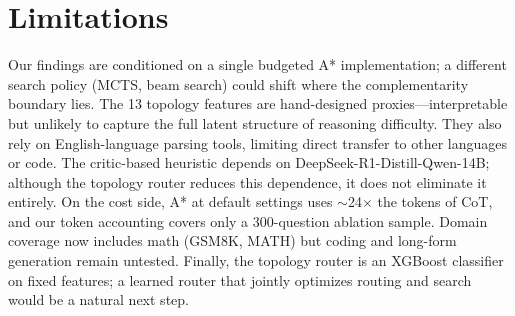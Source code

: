 \documentclass[11pt]{article}
\begin{document}
\section*{Limitations}
\label{sec:limitations}
Our findings are conditioned on a single budgeted A* implementation; a different search policy (MCTS, beam search) could shift where the complementarity boundary lies. The 13 topology features are hand-designed proxies---interpretable but unlikely to capture the full latent structure of reasoning difficulty. They also rely on English-language parsing tools, limiting direct transfer to other languages or code. The critic-based heuristic depends on DeepSeek-R1-Distill-Qwen-14B; although the topology router reduces this dependence, it does not eliminate it entirely. On the cost side, A* at default settings uses $\sim$24$\times$ the tokens of CoT, and our token accounting covers only a 300-question ablation sample. Domain coverage now includes math (GSM8K, MATH) but coding and long-form generation remain untested. Finally, the topology router is an XGBoost classifier on fixed features; a learned router that jointly optimizes routing and search would be a natural next step.








\end{document}

